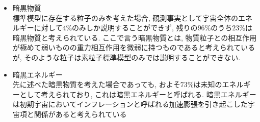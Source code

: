 \begin{itemize}
\begin{comment}
                        & $\theta_{13}$ & $ 3.10\times 10^{-4}$ \\
                        & $\theta_{23}$ & $ 1.65\times 10^{-2}$ \\
                        & $\delta$      & $ 1.14 $ \\\hline
      世代数  & $n_f$ & 3 \\\hline
      QCDのCPパラメータ &  $\theta$ & $ |\theta| < 10^{-10}$ \\\hline
    \end{tabular}
  \caption{標準模型に内在するパラメータ}
  \label{table:parameters}
  \end{center}
\end{table}
\end{comment}
      \item 暗黒物質\\
            標準模型に存在する粒子のみを考えた場合, 観測事実として宇宙全体のエネルギーに対して$4\%$のみしか説明することができず, 残りの$96\%$のうち$23\%$は暗黒物質と考えられている.
	    ここで言う暗黒物質とは, 物質粒子との相互作用が極めて弱いものの重力相互作用を微弱に持つものであると考えられているが, そのような粒子は素粒子標準模型のみでは説明することができない.
      \item 暗黒エネルギー\\
            先に述べた暗黒物質を考えた場合であっても, およそ$73\%$は未知のエネルギーとして考えられており, これは暗黒エネルギーと呼ばれる.
	    暗黒エネルギーは初期宇宙においてインフレーションと呼ばれる加速膨張を引き起こした宇宙項と関係があると考えられている
\end{itemize}

